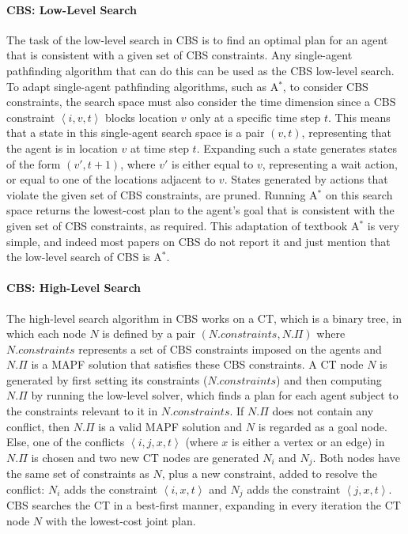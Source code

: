 \documentclass[review]{elsarticle}
\newcommand{\tuple}[1]{\ensuremath{\left \langle #1 \right \rangle }}
\newcommand\roni[1]{\nb{\textbf{Roni:}}{green}{#1}}
\newcommand{\cbs}{\ac{CBS}\xspace}
\newcommand{\ct}{\ac{CT}\xspace}
\newcommand{\astar}{A$^*$\xspace}
\newcommand{\mapf}{\ac{MAPF}\xspace}
\newcommand{\const}{\textit{constraints}\xspace}
\begin{document}
\paragraph{\textbf{\cbs: Low-Level Search}}
The task of the low-level search in \cbs is to find an optimal plan for an agent 
that is consistent with a given set of \cbs constraints. 
Any single-agent pathfinding algorithm that can do this can be used as the \cbs low-level search. 
To adapt single-agent pathfinding algorithms, such as \astar{}, to consider \cbs constraints, 
the search space must also consider the time dimension since a \cbs constraint $\tuple{i,v,t}$ 
blocks location $v$ only at a specific time step $t$. 
This means that a state in this single-agent search space is a pair $(v,t)$, representing that the agent is in location $v$ at time step $t$. Expanding such a state generates states 
of the form $(v',t+1)$, where $v'$ is either equal to $v$, representing a wait action, 
or equal to one of the locations adjacent to $v$. States generated by actions that violate the given set of \cbs constraints, are pruned. Running \astar{} on this search space returns the lowest-cost plan to the agent's goal that is consistent with the given set of \cbs constraints, as required. This adaptation of textbook \astar{} is very simple, and indeed most papers on \cbs do not report it and just mention that the low-level search of \cbs is \astar{}. 

\paragraph{\textbf{\cbs: High-Level Search}}
The high-level search algorithm in \cbs works on a \ct, which is a binary tree, in which each node
$N$ is defined by a pair $(N.\const, N.\Pi)$ where 
$N.\const$ represents a set of \cbs constraints imposed on the agents and $N.\Pi$ is a \mapf solution that satisfies these \cbs constraints. A \ct node $N$ is generated by first setting its constraints ($N.\const$) and then 
computing $N.\Pi$ by running the low-level solver, which finds a plan for each agent subject to the constraints relevant to it in $N.\const$. If $N.\Pi$ does not contain any conflict, then $N.\Pi$ is a valid \mapf solution and $N$ is regarded as a goal node. Else, one of the conflicts $\tuple{i,j,x,t}$ (where $x$ is either a vertex or an edge) in $N.\Pi$ is chosen and two new \ct nodes are generated $N_i$ and $N_j$. Both nodes have the same set of constraints as $N$, plus a new constraint, added to resolve the conflict: $N_i$ adds the constraint $\tuple{i,x,t}$
and $N_j$ adds the constraint $\tuple{j,x,t}$. \cbs searches the \ct in a best-first manner, expanding in every iteration the \ct node $N$ with the lowest-cost joint plan. %
\end{document}
